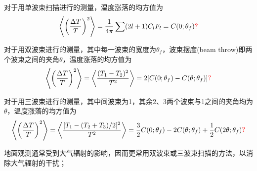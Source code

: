 \documentclass[12pt,a4paper]{article}
\begin{document}
对于用单波束扫描进行的测量，温度涨落的均方值为
\begin{equation}
\left\langle \left(\frac{\Delta T}{T} \right)^2 \right\rangle = \frac{1}{4\pi} \sum (2l+1)C_l F_l = C(0;\theta_f)\textcolor{red}{?}
\end{equation}

对于用双波束进行的测量，其中每一波束的宽度为$\theta_f$，波束摆度(beam throw)即两个波束之间的夹角$\theta$，温度涨落的均方值为
\begin{equation}
\left\langle \left(\frac{\Delta T}{T} \right)^2 \right\rangle = \left\langle \frac{(T_1 -T_2)^2}{T^2} \right\rangle = 2[C(0;\theta_f) -C(\theta;\theta_f)]\textcolor{red}{?}
\end{equation}

对于用三波束进行的测量，其中间波束为1，其余2、3两个波束与1之间的夹角均为$\theta$，温度涨落的均方值为
\begin{equation}
\left\langle \left(\frac{\Delta T}{T} \right)^2 \right\rangle = \left\langle \frac{[T_1 -(T_2+T_3)/2]^2}{T^2} \right\rangle = \frac{3}{2}C(0;\theta_f) -2C(\theta;\theta_f) +\frac{1}{2}C(2\theta;\theta_f)\textcolor{red}{?}
\end{equation}

地面观测通常受到大气辐射的影响，因而更常用双波束或三波束扫描的方法，以消除大气辐射的干扰；
\end{document}
